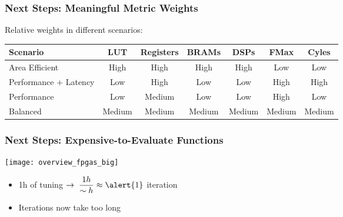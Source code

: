 \documentclass[10pt, compress, aspectratio=169, xcolor=table]{beamer}
\begin{document}
\begin{frame}[fragile]
    \frametitle{Next Steps: Meaningful Metric Weights}

    Relative weights in \alert{different scenarios}:

    \begin{table}[]
        \centering
        \begin{tabular}{@{}lcccccc@{}}
            \toprule
            Scenario & LUT & Registers & BRAMs & DSPs & FMax & Cyles \\ \midrule
            Area Efficient & \cellcolor[HTML]{32CB00} High & \cellcolor[HTML]{32CB00} High & \cellcolor[HTML]{32CB00} High & \cellcolor[HTML]{32CB00} High & \cellcolor[HTML]{FD6864} Low & \cellcolor[HTML]{FD6864} Low \\
            Performance + Latency & \cellcolor[HTML]{FD6864} Low & \cellcolor[HTML]{32CB00} High & \cellcolor[HTML]{FD6864} Low & \cellcolor[HTML]{FD6864} Low & \cellcolor[HTML]{32CB00} High & \cellcolor[HTML]{32CB00} High \\
            Performance & \cellcolor[HTML]{FD6864} Low & \cellcolor[HTML]{FFCC67} Medium & \cellcolor[HTML]{FD6864} Low & \cellcolor[HTML]{FD6864} Low & \cellcolor[HTML]{32CB00} High & \cellcolor[HTML]{FD6864} Low \\
            Balanced & \cellcolor[HTML]{FFCC67} Medium & \cellcolor[HTML]{FFCC67} Medium & \cellcolor[HTML]{FFCC67} Medium & \cellcolor[HTML]{FFCC67} Medium & \cellcolor[HTML]{FFCC67} Medium & \cellcolor[HTML]{FFCC67} Medium \\ \bottomrule
        \end{tabular}
    \end{table}
\end{frame}


\begin{frame}
    \frametitle{Next Steps: Expensive-to-Evaluate Functions}
    \begin{center}
        \texttt{[image: overview\_fpgas\_big]}
    \end{center}

    \begin{itemize}
        \item \alert{1h} of tuning $\rightarrow \; \dfrac{1h}{\sim{}h} \approx \alert{1}$ \alert{iteration}
        \item Iterations now \alert{take too long}
    \end{itemize}
\end{frame}
\end{document}
